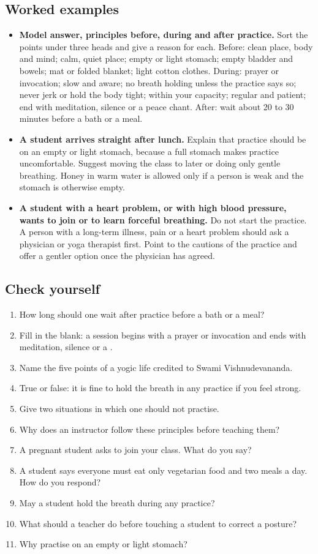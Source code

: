 \subsection*{Worked examples}
\begin{itemize}
\item \textbf{Model answer, principles before, during and after practice.} Sort the points under three heads and give a reason for each. Before: clean place, body and mind; calm, quiet place; empty or light stomach; empty bladder and bowels; mat or folded blanket; light cotton clothes. During: prayer or invocation; slow and aware; no breath holding unless the practice says so; never jerk or hold the body tight; within your capacity; regular and patient; end with meditation, silence or a peace chant. After: wait about 20 to 30 minutes before a bath or a meal.
\item \textbf{A student arrives straight after lunch.} Explain that practice should be on an empty or light stomach, because a full stomach makes practice uncomfortable. Suggest moving the class to later or doing only gentle breathing. Honey in warm water is allowed only if a person is weak and the stomach is otherwise empty.
\item \textbf{A student with a heart problem, or with high blood pressure, wants to join or to learn forceful breathing.} Do not start the practice. A person with a long-term illness, pain or a heart problem should ask a physician or yoga therapist first. Point to the cautions of the practice and offer a gentler option once the physician has agreed.
\end{itemize}

\subsection*{Check yourself}
\begin{enumerate}
\item How long should one wait after practice before a bath or a meal?
\item Fill in the blank: a session begins with a prayer or invocation and ends with meditation, silence or a \underline{\hspace{2cm}}.
\item Name the five points of a yogic life credited to Swami Vishnudevananda.
\item True or false: it is fine to hold the breath in any practice if you feel strong.
\item Give two situations in which one should not practise.
\item Why does an instructor follow these principles before teaching them?
\item A pregnant student asks to join your class. What do you say?
\item A student says everyone must eat only vegetarian food and two meals a day. How do you respond?
\item May a student hold the breath during any practice?
\item What should a teacher do before touching a student to correct a posture?
\item Why practise on an empty or light stomach?
\end{enumerate}

